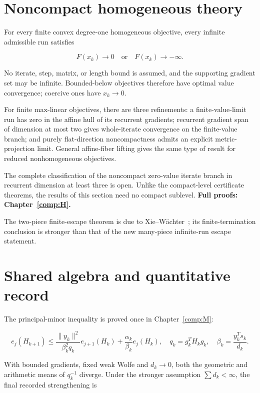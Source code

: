 

\section{Noncompact homogeneous theory}\label{noncompact-homogeneous-theory-remains-independent}

For every finite convex degree-one homogeneous objective, every infinite admissible run satisfies

\[F(x_k)\to0\quad\text{or}\quad F(x_k)\to-\infty.\]

No iterate, step, matrix, or length bound is assumed, and the supporting gradient set may be infinite. Bounded-below objectives therefore have optimal value convergence; coercive ones have \(x_k\to0\).

For finite max-linear objectives, there are three refinements: a finite-value-limit run has zero in the affine hull of its recurrent gradients; recurrent gradient span of dimension at most two gives whole-iterate convergence on the finite-value branch; and purely flat-direction noncompactness admits an explicit metric-projection limit. General affine-fiber lifting gives the same type of result for reduced nonhomogeneous objectives.

The complete classification of the noncompact zero-value iterate branch in recurrent dimension at least three is open. Unlike the compact-level certificate theorems, the results of this section need no compact sublevel. \textbf{Full proofs: Chapter~\ref{comp:H}.}

The two-piece finite-escape theorem is due to Xie--Wächter~\cite{XW}; its finite-termination conclusion is stronger than that of the new many-piece infinite-run escape statement.



\section{Shared algebra and quantitative record}\label{shared-algebra-and-quantitative-record}

The principal-minor inequality is proved once in Chapter~\ref{comp:M}:

\[e_j(H_{k+1})\le
\frac{\|y_k\|^2}{\beta_k^2q_k}e_{j+1}(H_k)
+\frac{\alpha_k}{\beta_k}e_j(H_k),\quad
q_k=g_k^TH_kg_k,\quad\beta_k=\frac{y_k^Ts_k}{d_k}.\]

With bounded gradients, fixed weak Wolfe and \(d_k\to0\), both the geometric and arithmetic means of \(q_k^{-1}\) diverge. Under the stronger assumption \(\sum d_k<\infty\), the final recorded strengthening is

